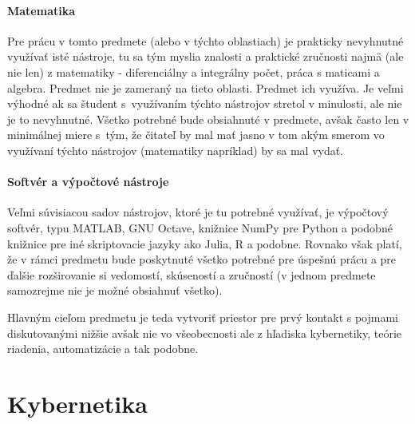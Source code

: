 \documentclass[a4paper, 10pt, ]{article}
\begin{document}
\begin{center}

    \vbox{%
        \makebox[\textwidth][c]{%
        
        }
    }
	\label{schURO_vseob}

\end{center}


\paragraph{Matematika}

Pre prácu v tomto predmete (alebo v týchto oblastiach) je prakticky nevyhnutné využívať isté nástroje, tu sa tým myslia znalosti a praktické zručnosti najmä (ale nie len) z matematiky - diferenciálny a integrálny počet, práca s maticami a algebra. Predmet nie je zameraný na tieto oblasti. Predmet ich využíva. Je veľmi výhodné ak sa študent s~využívaním týchto nástrojov stretol v minulosti, ale nie je to nevyhnutné. Všetko potrebné bude obsiahnuté v predmete, avšak často len v minimálnej miere s~tým, že čitateľ by mal mať jasno v tom akým smerom vo využívaní týchto nástrojov (matematiky napríklad) by sa mal vydať.


\paragraph{Softvér a výpočtové nástroje}

Veľmi súvisiacou sadov nástrojov, ktoré je tu potrebné využívať, je výpočtový softvér, typu MATLAB, GNU Octave, knižnice NumPy pre Python a podobné knižnice pre iné skriptovacie jazyky ako Julia, R a podobne. Rovnako však platí, že v rámci predmetu bude poskytnuté všetko potrebné pre úspešnú prácu a pre ďalšie rozširovanie si vedomostí, skúseností a zručností (v jednom predmete samozrejme nie je možné obsiahnuť všetko).

\bigskip

Hlavným cieľom predmetu je teda vytvoriť priestor pre prvý kontakt s pojmami diskutovanými nižšie avšak nie vo všeobecnosti ale z hľadiska kybernetiky, teórie riadenia, automatizácie a tak podobne.





\section{Kybernetika}
\end{document}
